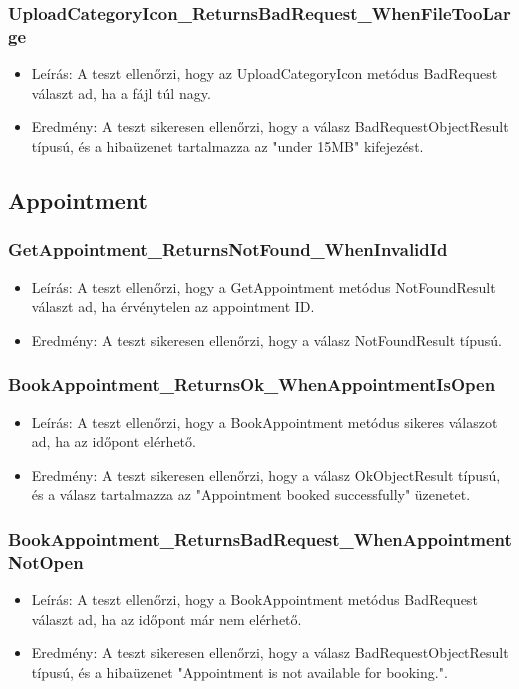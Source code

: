 \documentclass[11pt]{article}
\begin{document}
\subsubsection{UploadCategoryIcon\_ReturnsBadRequest\_WhenFileTooLarge}
\label{sec:orgae5d879}
\begin{itemize}
\item Leírás: A teszt ellenőrzi, hogy az UploadCategoryIcon metódus BadRequest választ ad, ha a fájl túl nagy.
\item Eredmény: A teszt sikeresen ellenőrzi, hogy a válasz BadRequestObjectResult típusú, és a hibaüzenet tartalmazza az "under 15MB" kifejezést.
\end{itemize}
\subsection{Appointment}
\label{sec:org7048194}
\subsubsection{GetAppointment\_ReturnsNotFound\_WhenInvalidId}
\label{sec:orgfe09a36}
\begin{itemize}
\item Leírás: A teszt ellenőrzi, hogy a GetAppointment metódus NotFoundResult választ ad, ha érvénytelen az appointment ID.
\item Eredmény: A teszt sikeresen ellenőrzi, hogy a válasz NotFoundResult típusú.
\end{itemize}
\subsubsection{BookAppointment\_ReturnsOk\_WhenAppointmentIsOpen}
\label{sec:org77e8af9}
\begin{itemize}
\item Leírás: A teszt ellenőrzi, hogy a BookAppointment metódus sikeres válaszot ad, ha az időpont elérhető.
\item Eredmény: A teszt sikeresen ellenőrzi, hogy a válasz OkObjectResult típusú, és a válasz tartalmazza az "Appointment booked successfully" üzenetet.
\end{itemize}
\subsubsection{BookAppointment\_ReturnsBadRequest\_WhenAppointmentNotOpen}
\label{sec:org407b4f3}
\begin{itemize}
\item Leírás: A teszt ellenőrzi, hogy a BookAppointment metódus BadRequest választ ad, ha az időpont már nem elérhető.
\item Eredmény: A teszt sikeresen ellenőrzi, hogy a válasz BadRequestObjectResult típusú, és a hibaüzenet "Appointment is not available for booking.".
\end{itemize}
\end{document}
